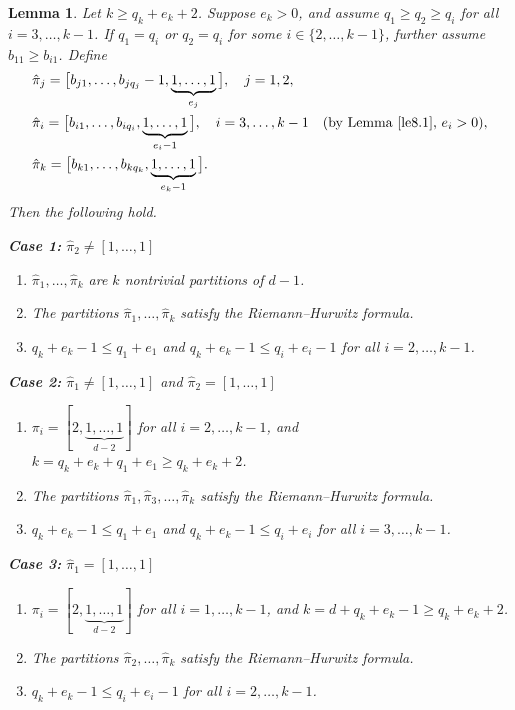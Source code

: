\documentclass[microtype]{gtpart}     %
\newtheorem{lem}[theorem]{Lemma}          %
\theoremstyle{definition}
\begin{document}
\begin{lem}\label{le8.3}
Let \( k \geq q_k + e_k + 2 \). Suppose \( e_k > 0 \), and assume \( q_1 \geq q_2 \geq q_i \) for all \( i = 3, \dots, k-1 \). If \( q_1 = q_i \) or \( q_2 = q_i \) for some \( i \in \{2, \dots, k-1\} \), further assume \( b_{11} \geq b_{i1} \). Define
\[
\begin{aligned}
&\hat{\pi}_j = \big[ b_{j1}, \dots, b_{jq_j} - 1, \underbrace{1, \dots, 1}_{e_j} \big], \quad j = 1, 2, \\
&\hat{\pi}_i = \big[ b_{i1}, \dots, b_{iq_i}, \underbrace{1, \dots, 1}_{e_i - 1} \big], \quad i = 3, \dots, k-1 \quad (\text{by Lemma~\ref{le8.1}, } e_i > 0), \\
&\hat{\pi}_k = \big[ b_{k1}, \dots, b_{kq_k}, \underbrace{1, \dots, 1}_{e_k - 1} \big].
\end{aligned}
\]
Then the following hold.

\noindent \textbf{Case 1:} \(\hat{\pi}_2 \neq [1, \dots, 1]\)
\begin{enumerate}
    \item \(\hat{\pi}_1, \dots, \hat{\pi}_k\) are \(k\) nontrivial partitions of \(d - 1\).
    \item The partitions \(\hat{\pi}_1, \dots, \hat{\pi}_k\) satisfy the Riemann--Hurwitz formula.
    \item \(q_k + e_k - 1 \leq q_1 + e_1\) and \(q_k + e_k - 1 \leq q_i + e_i - 1\) for all \(i = 2, \dots, k - 1\).
\end{enumerate}

\noindent \textbf{Case 2:} \(\hat{\pi}_1 \neq [1, \dots, 1]\) and \(\hat{\pi}_2 = [1, \dots, 1]\)
\begin{enumerate}
    \item \(\pi_i = [2, \underbrace{1, \dots, 1}_{d - 2}]\) for all \(i = 2, \dots, k - 1\), and \(k = q_k + e_k + q_1 + e_1 \geq q_k + e_k + 2\).
    \item The partitions \(\hat{\pi}_1, \hat{\pi}_3, \dots, \hat{\pi}_k\) satisfy the Riemann--Hurwitz formula.
    \item \(q_k + e_k - 1 \leq q_1 + e_1\) and \(q_k + e_k - 1 \leq q_i + e_i\) for all \(i = 3, \dots, k - 1\).
\end{enumerate}

\noindent \textbf{Case 3:} \(\hat{\pi}_1 = [1, \dots, 1]\)
\begin{enumerate}
    \item \(\pi_i = [2, \underbrace{1, \dots, 1}_{d - 2}]\) for all \(i = 1, \dots, k - 1\), and \(k = d + q_k + e_k - 1 \geq q_k + e_k + 2\).
    \item The partitions \(\hat{\pi}_2, \dots, \hat{\pi}_k\) satisfy the Riemann--Hurwitz formula.
    \item \(q_k + e_k - 1 \leq q_i + e_i - 1\) for all \(i = 2, \dots, k - 1\).
\end{enumerate}
\end{lem}
\end{document}
